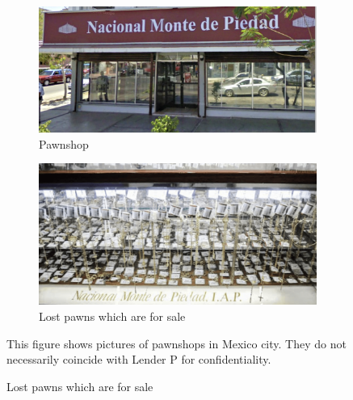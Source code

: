 \begin{figure}[H]
\begin{center}
    \begin{subfigure}{0.45\textwidth}
    \caption{Pawnshop}
        \centering
        \includegraphics[width=\textwidth]{Figuras/empenio2_.png}
    \end{subfigure}
    \begin{subfigure}{0.415\textwidth}
    \caption{Lost pawns which are for sale}
        \centering
        \includegraphics[width=\textwidth]{Figuras/empenio3_.png}
    \end{subfigure}
    \end{center}
    \scriptsize
        This figure  shows pictures of pawnshops in Mexico city. They do not necessarily coincide with Lender P for confidentiality. 
\end{figure}



